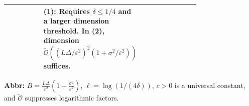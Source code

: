\begin{table}[tp]
\begin{threeparttable}
\begin{tabularx}{\linewidth}{@{}>{\raggedright\arraybackslash}p{0.22\linewidth}>{\raggedright\arraybackslash}p{0.24\linewidth}>{\raggedright\arraybackslash}p{0.30\linewidth}>{\raggedright\arraybackslash}X@{}}
& \textbf{(1)}: Requires $\delta\le1/4$ and a larger dimension threshold. In \textbf{(2)}, dimension $\widetilde{\mathcal{O}}((L\Delta/\varepsilon^2)^2(1+\sigma^2/\varepsilon^2))$ suffices. \\
\bottomrule
\end{tabularx}
\begin{tablenotes}[flushleft]\footnotesize
\item[] \textbf{Abbr:} $B=\frac{L\Delta}{\varepsilon^2}(1+\frac{\sigma^2}{\varepsilon^2})$, $\ell=\log(1/(4\delta))$, $c>0$ is a universal constant, and $\widetilde{\mathcal{O}}$ suppresses logarithmic factors.
\end{tablenotes}
\end{threeparttable}
\end{table}
